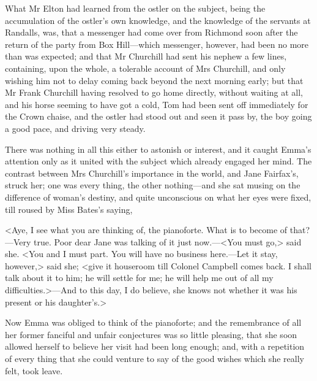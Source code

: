 What Mr Elton had learned from the ostler on the subject, being the accumulation of the ostler's own knowledge, and the knowledge of the servants at Randalls, was, that a messenger had come over from Richmond soon after the return of the party from Box Hill—which messenger, however, had been no more than was expected; and that Mr Churchill had sent his nephew a few lines, containing, upon the whole, a tolerable account of Mrs Churchill, and only wishing him not to delay coming back beyond the next morning early; but that Mr Frank Churchill having resolved to go home directly, without waiting at all, and his horse seeming to have got a cold, Tom had been sent off immediately for the Crown chaise, and the ostler had stood out and seen it pass by, the boy going a good pace, and driving very steady.

There was nothing in all this either to astonish or interest, and it caught Emma's attention only as it united with the subject which already engaged her mind. The contrast between Mrs Churchill's importance in the world, and Jane Fairfax's, struck her; one was every thing, the other nothing—and she sat musing on the difference of woman's destiny, and quite unconscious on what her eyes were fixed, till roused by Miss Bates's saying,

<Aye, I see what you are thinking of, the pianoforte. What is to become of that?—Very true. Poor dear Jane was talking of it just now.—<You must go,> said she. <You and I must part. You will have no business here.—Let it stay, however,> said she; <give it houseroom till Colonel Campbell comes back. I shall talk about it to him; he will settle for me; he will help me out of all my difficulties.>—And to this day, I do believe, she knows not whether it was his present or his daughter's.>

Now Emma was obliged to think of the pianoforte; and the remembrance of all her former fanciful and unfair conjectures was so little pleasing, that she soon allowed herself to believe her visit had been long enough; and, with a repetition of every thing that she could venture to say of the good wishes which she really felt, took leave.